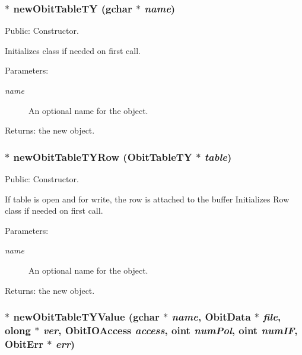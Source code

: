 \subsubsection{$\ast$ new\-Obit\-Table\-TY (gchar $\ast$ {\em name})}\label{ObitTableTY_8c_a16}


Public: Constructor. 

Initializes class if needed on first call. \begin{Desc}
\item[Parameters:]
\begin{description}
\item[{\em name}]An optional name for the object. \end{description}
\end{Desc}
\begin{Desc}
\item[Returns:]the new object. \end{Desc}
\subsubsection{$\ast$ new\-Obit\-Table\-TYRow ({\bf Obit\-Table\-TY} $\ast$ {\em table})}\label{ObitTableTY_8c_a14}


Public: Constructor. 

If table is open and for write, the row is attached to the buffer Initializes Row class if needed on first call. \begin{Desc}
\item[Parameters:]
\begin{description}
\item[{\em name}]An optional name for the object. \end{description}
\end{Desc}
\begin{Desc}
\item[Returns:]the new object. \end{Desc}
\subsubsection{$\ast$ new\-Obit\-Table\-TYValue (gchar $\ast$ {\em name}, {\bf Obit\-Data} $\ast$ {\em file}, {\bf olong} $\ast$ {\em ver}, Obit\-IOAccess {\em access}, {\bf oint} {\em num\-Pol}, {\bf oint} {\em num\-IF}, {\bf Obit\-Err} $\ast$ {\em err})}\label{ObitTableTY_8c_a18}


